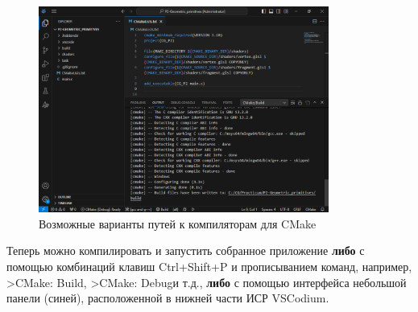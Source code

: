 \documentclass[a4paper,12pt]{article}
\begin{document}
        \begin{figure} [H]
            \centering
			\includegraphics[width=0.85\textwidth]{images/CMake_build.png}
			\caption {Возможные варианты путей к компиляторам для CMake}
            \label{fig:CMake_build}
        \end{figure}
        
        Теперь можно компилировать и запустить собранное приложение \textbf{либо} с помощью комбинаций клавиш Ctrl+Shift+P и прописыванием команд, например,  \textquotedbl>CMake: Build\textquotedbl, \textquotedbl >CMake: Debug\textquotedbl и т.д., \textbf{либо} с помощью интерфейса небольшой панели (синей), расположенной в нижней части ИСР VSCodium.
\end{document}
